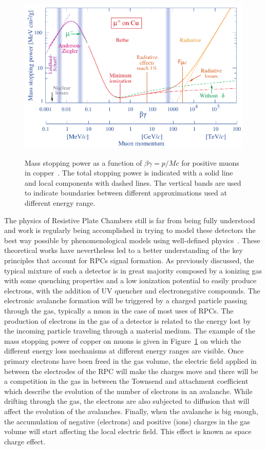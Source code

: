 	\begin{figure}[H]
		\centering
		\includegraphics[width = \plotwidth]{fig/chapt4/rpp_icru49_cu_col.pdf}\\
		\caption{\label{fig:enerlylosscopper} Mass stopping power as a function of $\beta\gamma = p/Mc$ for positive muons in copper~\cite{PDG2018}. The total stopping power is indicated with a solid line and local components with dashed lines. The vertical bands are used to indicate boundaries between different approximations used at different energy range.}
	\end{figure}

	The physics of Resistive Plate Chambers still is far from being fully understood and work is regularly being accomplished in trying to model these detectors the best way possible by phenomenological models using well-defined physics~\cite{LIPPMANN2003,VINCENT2016,VINCENT2017}. These theoretical works have nevertheless led to a better understanding of the key principles that account for RPCs signal formation. As previously discussed, the typical mixture of such a detector is in great majority composed by a ionizing gas with some quenching properties and a low ionization potential to easily produce electrons, with the addition of UV quencher and electronegative compounds. The electronic avalanche formation will be triggered by a charged particle passing through the gas, typically a muon in the case of most uses of RPCs. The production of electrons in the gas of a detector is related to the energy lost by the incoming particle traveling through a material medium. The example of the mass stopping power of copper on muons is given in Figure~\ref{fig:enerlylosscopper} on which the different energy loss mechanisms at different energy ranges are visible. Once primary electrons have been freed in the gas volume, the electric field applied in between the electrodes of the RPC will make the charges move and there will be a competition in the gas in between the Townsend and attachment coefficient which describe the evolution of the number of electrons in an avalanche. While drifting through the gas, the electrons are also subjected to diffusion that will affect the evolution of the avalanches. Finally, when the avalanche is big enough, the accumulation of negative (electrons) and positive (ions) charges in the gas volume will start affecting the local electric field. This effect is known as space charge effect.
	
